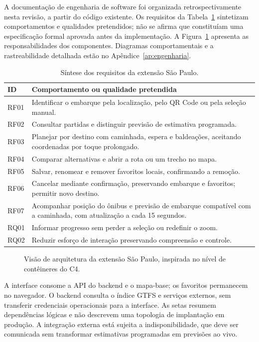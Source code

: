 A documentação de engenharia de software foi organizada retrospectivamente nesta revisão, a partir do código existente. Os requisitos da Tabela~\ref{tab:requisitos-pap} sintetizam comportamentos e qualidades pretendidos; não se afirma que constituíam uma especificação formal aprovada antes da implementação. A Figura~\ref{fig:arquitetura-pap} apresenta as responsabilidades dos componentes. Diagramas comportamentais e a rastreabilidade detalhada estão no Apêndice~\ref{ap:engenharia}.
\begin{table}[H]\centering\small
\caption{Síntese dos requisitos da extensão São Paulo.}\label{tab:requisitos-pap}
\begin{tabular}{p{1.5cm}p{11.5cm}}\hline
ID & Comportamento ou qualidade pretendida\\\hline
RF01 & Identificar o embarque pela localização, pelo QR Code ou pela seleção manual.\\
RF02 & Consultar partidas e distinguir previsão de estimativa programada.\\
RF03 & Planejar por destino com caminhada, espera e baldeações, aceitando coordenadas por toque prolongado.\\
RF04 & Comparar alternativas e abrir a rota ou um trecho no mapa.\\
RF05 & Salvar, renomear e remover favoritos locais, confirmando a remoção.\\
RF06 & Cancelar mediante confirmação, preservando embarque e favoritos; permitir novo destino.\\
RF07 & Acompanhar posição do ônibus e previsão de embarque compatível com a caminhada, com atualização a cada 15 segundos.\\
RQ01 & Informar progresso sem perder a seleção ou redefinir o zoom.\\
RQ02 & Reduzir esforço de interação preservando compreensão e controle.\\\hline
\end{tabular}
\end{table}

\begin{figure}[H]
\centering
\caption{Visão de arquitetura da extensão São Paulo, inspirada no nível de contêineres do C4.}\label{fig:arquitetura-pap}
\end{figure}

A interface consome a API do backend e o mapa-base; os favoritos permanecem no navegador. O backend consulta o índice GTFS e serviços externos, sem transferir credenciais operacionais para a interface. As setas resumem dependências lógicas e não descrevem uma topologia de implantação em produção. A integração externa está sujeita a indisponibilidade, que deve ser comunicada sem transformar estimativas programadas em previsões ao vivo.
